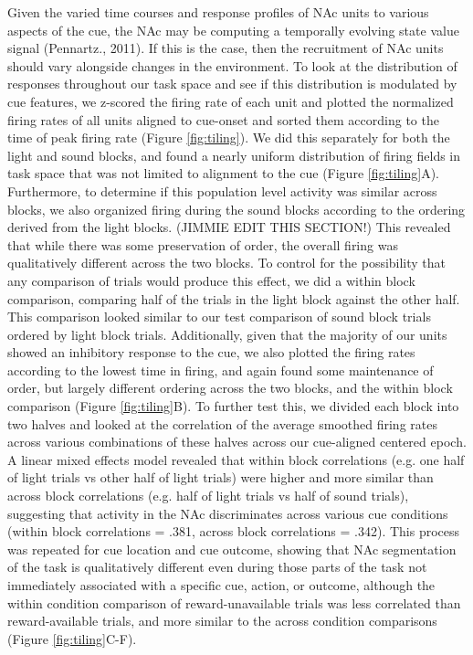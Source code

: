 \documentclass[11pt]{article}
\begin{document}
{Given the varied time courses and response profiles of NAc units to various
aspects of the cue, the NAc may be computing a temporally evolving state value
signal (Pennartz., 2011). If this is the case, then the recruitment of NAc units
should vary alongside changes in the environment. To look at the distribution of
responses throughout our task space and see if this distribution is modulated by
cue features, we z-scored the firing rate of each unit and plotted the
normalized firing rates of all units aligned to cue-onset and sorted them
according to the time of peak firing rate (Figure \ref{fig:tiling}). We did this
separately for both the light and sound blocks, and found a nearly uniform
distribution of firing fields in task space that was not limited to alignment to
the cue (Figure \ref{fig:tiling}A). Furthermore, to determine if this population
level activity was similar across blocks, we also organized firing during the
sound blocks according to the ordering derived from the light
blocks. {\color{red}(JIMMIE EDIT THIS SECTION!)} This revealed that while there
was some preservation of order, the overall firing was qualitatively different
across the two blocks. To control for the possibility that any comparison of
trials would produce this effect, we did a within block comparison, comparing
half of the trials in the light block against the other half. This comparison
looked similar to our test comparison of sound block trials ordered by light
block trials. Additionally, given that the majority of our units showed an
inhibitory response to the cue, we also plotted the firing rates according to
the lowest time in firing, and again found some maintenance of order, but
largely different ordering across the two blocks, and the within block
comparison (Figure \ref{fig:tiling}B). To further test this, we divided each
block into two halves and looked at the correlation of the average smoothed
firing rates across various combinations of these halves across our cue-aligned
centered epoch. A linear mixed effects model revealed that within block
correlations (e.g. one half of light trials vs other half of light trials) were
higher and more similar than across block correlations (e.g. half of light
trials vs half of sound trials), suggesting that activity in the NAc
discriminates across various cue conditions (within block correlations = .381,
across block correlations = .342). This process was repeated for cue location
and cue outcome, showing that NAc segmentation of the task is qualitatively
different even during those parts of the task not immediately associated with a
specific cue, action, or outcome, although the within condition comparison of
reward-unavailable trials was less correlated than reward-available trials, and
more similar to the across condition comparisons (Figure \ref{fig:tiling}C-F).

}
\end{document}
